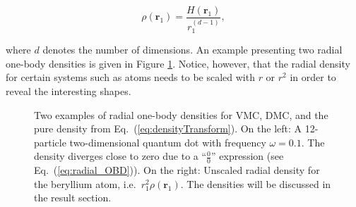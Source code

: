 \begin{equation}
 \rho(\mathbf{r}_1) = \frac{H(\mathbf{r}_1)}{r_1^{(d-1)}},\label{eq:radial_OBD}
\end{equation}

where $d$ denotes the number of dimensions. An example presenting two radial one-body densities is given in Figure \ref{fig:OBD_ex}. Notice, however, that the radial density for certain systems such as atoms needs to be scaled with $r$ or $r^2$ in order to reveal the interesting shapes. 

\begin{figure}
 \begin{center}
  \caption{Two examples of radial one-body densities for VMC, DMC, and the pure density from Eq.~(\ref{eq:densityTransform}). On the left: A 12-particle two-dimensional quantum dot with frequency $\omega=0.1$. The density diverges close to zero due to a ``$\frac{0}{0}$'' expression (see Eq.~(\ref{eq:radial_OBD})). On the right: Unscaled radial density for the beryllium atom, i.e.~$r_1^2\rho(\mathbf{r}_1)$. The densities will be discussed in the result section.}
  \label{fig:OBD_ex}
 \end{center}
\end{figure}


